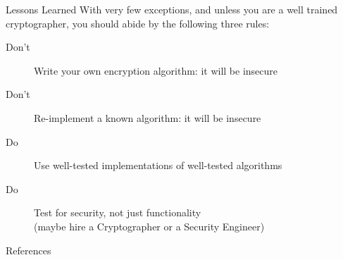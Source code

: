 \documentclass[style=sailor]{powerdot}
\begin{document}
\begin{slide}{Lessons Learned}
\pause
With very few exceptions, and unless you are a well trained cryptographer, you should abide by the following three rules:

\begin{description}
\item[Don't] Write your own encryption algorithm: it will be insecure \pause
\item[Don't] Re-implement a known algorithm: it will be insecure \pause
\item [Do\phantom{n't}] Use well-tested implementations of well-tested algorithms \pause
\item [Do\phantom{n't}] Test for security, not just functionality\\\hspace{30pt}(maybe hire a Cryptographer or a Security Engineer)
\end{description}
\end{slide}

\begin{slide}[toc=]{References}
\printbibliography
\end{slide}
\end{document}
